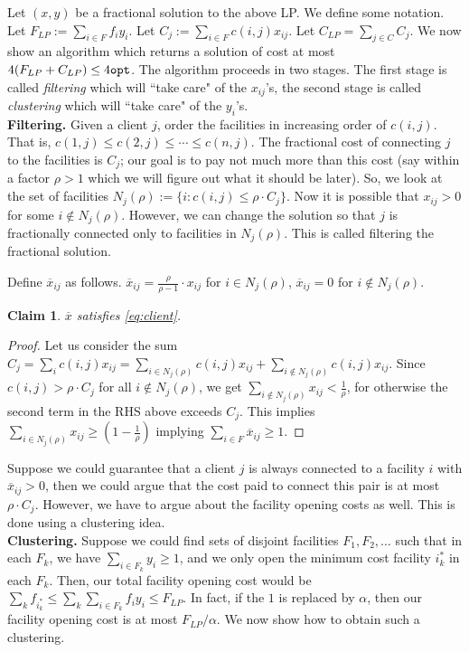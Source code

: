 \documentclass[11pt]{article}
\newtheorem{claim}{Claim}
\def\bar{\overline}
\def\opt{{\tt opt}}
\begin{document}
Let $(x,y)$ be a fractional solution to the above LP. We define some notation.
Let $F_{LP} := \sum_{i\in F}f_iy_i$. Let $C_j := \sum_{i\in F}c(i,j)x_{ij}$. Let $C_{LP} = \sum_{j\in C} C_j$.
We now show an algorithm which returns a solution of cost at most $4(F_{LP} + C_{LP}) \le 4\opt$.
The algorithm proceeds in two stages. The first stage is called {\em filtering} which will ``take care" of the 
$x_{ij}$'s, the second stage is called {\em clustering} which will ``take care" of the $y_i$'s. \\

\noindent
{\bf Filtering.} Given a client $j$, order the facilities in increasing order of $c(i,j)$. That is, 
$c(1,j) \le c(2,j) \le \cdots \le c(n,j)$. The fractional cost of connecting $j$ to the facilities is $C_j$; our
goal is to pay not much more than this cost (say within a factor $\rho > 1$ which we will figure out what it should be later). So, we look at the set of facilities $N_j(\rho) := \{i: c(i,j)\le \rho\cdot C_j\}$. Now it is possible that $x_{ij} > 0$ for some $i\notin N_j(\rho)$. However, we can change the solution so that $j$ is fractionally connected only to facilities in $N_j(\rho)$. This is called filtering the fractional solution.

\def\x{\bar{x}}
\def\y{\bar{y}}
Define $\x_{ij}$ as follows. $\x_{ij} = \frac{\rho}{\rho -1 }\cdot x_{ij}$ for $i\in N_j(\rho)$, $\x_{ij} = 0$ for $i\notin N_j(\rho)$. 
\begin{claim}
$\x$ satisfies \eqref{eq:client}.
\end{claim}
\begin{proof}
Let us consider the sum $C_j = \sum_{i} c(i,j)x_{ij} = \sum_{i\in N_j(\rho)} c(i,j)x_{ij} + \sum_{i\notin N_j(\rho)} c(i,j)x_{ij}$. Since $c(i,j) > \rho\cdot C_j$ for all $i\notin N_j(\rho)$, we get 
$\sum_{i\notin N_j(\rho)} x_{ij} < \frac{1}{\rho}$, for otherwise the second term in the RHS above exceeds $C_j$. This implies $\sum_{i\in N_j(\rho)} x_{ij} \ge (1 - \frac{1}{\rho})$ implying $\sum_{i\in F} \x_{ij} \ge 1$.
\end{proof}

\noindent
Suppose we could guarantee that a client $j$ is always connected to a facility $i$ with $\x_{ij} > 0$,
then we could argue that the cost paid to connect this pair is at most $\rho\cdot C_j$. 
However, we have to argue about the facility opening costs as well. This is done using a clustering idea. \\

\noindent
{\bf Clustering.} Suppose we could find sets of disjoint facilities $F_1,F_2,\ldots$ such that in each $F_k$, 
we have $\sum_{i\in F_k}y_i \ge 1$, and we only open the minimum cost facility $i^*_k$ in each $F_k$. Then, our total facility opening cost would be $\sum_{k} f_{i^*_k} \le \sum_k \sum_{i\in F_k} f_iy_i \le F_{LP}$.
In fact, if the $1$ is replaced by $\alpha$, then our facility opening cost is at most $F_{LP}/\alpha$.
We now show how to obtain such a clustering.  \\
\end{document}
